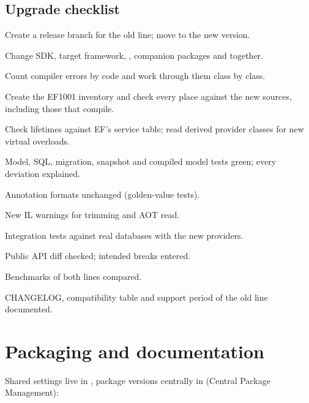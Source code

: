 \section{Upgrade checklist}

\begin{checklist}
  \item Create a release branch for the old line; move  to the new version.
  \item Change SDK, target framework, , companion packages and
     together.
  \item Count compiler errors by code and work through them class by class.
  \item Create the EF1001 inventory and check every place against the new sources, including
    those that compile.
  \item Check lifetimes against EF's service table; read derived provider classes for new
    virtual overloads.
  \item Model, SQL, migration, snapshot and compiled model tests green; every deviation
    explained.
  \item Annotation formats unchanged (golden-value tests).
  \item New IL warnings for trimming and AOT read.
  \item Integration tests against real databases with the new providers.
  \item Public API diff checked; intended breaks entered.
  \item Benchmarks of both lines compared.
  \item CHANGELOG, compatibility table and support period of the old line documented.
\end{checklist}

\chapter{Packaging and documentation}\label{ch:packaging-and-documentation}

Shared settings live in , package
versions centrally in  (Central
Package Management):


